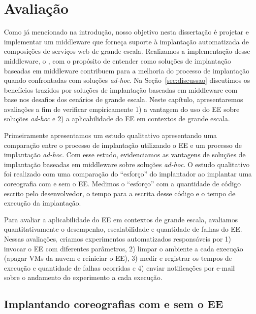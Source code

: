 \chapter{Avaliação}
\label{cap:avaliacao}

Como já mencionado na introdução, 
nosso objetivo nesta dissertação é projetar e implementar um middleware que forneça 
suporte à implantação automatizada de composições de serviços web de grande escala.
Realizamos a implementação desse middleware, o \ee, com o propósito de entender como soluções de
implantação baseadas em middleware contribuem para a melhoria do processo
de implantação quando confrontadas com soluções \emph{ad-hoc}.
Na Seção~\ref{sec:discussao} discutimos os benefícios trazidos por soluções
de implantação baseadas em middleware com base nos desafios dos cenários de grande escala. 
Neste capítulo, apresentaremos avaliações a fim de verificar empiricamente
1) a vantagem do uso do EE sobre soluções \emph{ad-hoc} e
2) a aplicabilidade do EE em contextos de grande escala.

Primeiramente apresentamos um estudo qualitativo apresentando
uma comparação entre o processo de implantação utilizando o EE
e um processo de implantação \emph{ad-hoc}.
Com esse estudo, evidenciamos as vantagens de soluções de implantação
baseadas em middleware sobre soluções \emph{ad-hoc}.
O estudo qualitativo foi realizado com uma comparação do ``esforço''
do implantador ao implantar uma coreografia com e sem o EE.
Medimos o ``esforço'' com a quantidade de código escrito pelo desenvolvedor,
o tempo para a escrita desse código e o tempo de execução da implantação.

Para avaliar a aplicabilidade do EE em contextos de grande escala,
avaliamos quantitativamente o desempenho, escalabilidade e quantidade de falhas do EE.
Nessas avaliações, criamos experimentos automatizados
responsáveis por 1) invocar o EE com diferentes parâmetros, 
2) limpar o ambiente a cada execução (apagar VMs da nuvem e reiniciar o EE),
3) medir e registrar os tempos de execução e quantidade de falhas ocorridas e
4) enviar notificações por e-mail sobre o andamento do experimento a cada execução.



\section{Implantando coreografias com e sem o EE}
\label{sec:avaliacao_eng_sw}

